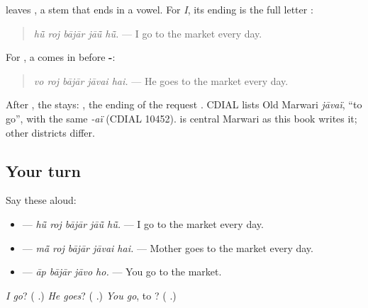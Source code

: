 \begin{grammarlens}[title={Grammar Lens: \mw{जा}}]
\textbf{} leaves \textbf{}, a stem that ends in a vowel. For \emph{I}, its ending is the full letter \textbf{}:

\begin{quote}
\textbf{    }
\end{quote}

\begin{quote}
\emph{hū̃ roj bājār jāū̃ hū̃.} — I go to the market every day.
\end{quote}

For \textbf{}, a \textbf{} comes in before \textbf{-}:

\begin{quote}
\textbf{    }
\end{quote}

\begin{quote}
\emph{vo roj bājār jāvai hai.} — He goes to the market every day.
\end{quote}

After \textbf{}, the \textbf{} stays: \textbf{  }, the ending of the request \textbf{}. CDIAL lists Old Marwari \emph{jāvaï}, \textquotedblleft{}to go\textquotedblright{}, with the same \emph{-aï} (CDIAL 10452). \textbf{} is central Marwari as this book writes it; other districts differ.
\end{grammarlens}

\subsection*{Your turn}
Say these aloud:

\begin{itemize}
\raggedright
  \item \textbf{    } — \emph{hū̃ roj bājār jāū̃ hū̃.} — I go to the market every day.
  \item \textbf{    } — \emph{mā̃ roj bājār jāvai hai.} — Mother goes to the market every day.
  \item \textbf{   } — \emph{āp bājār jāvo ho.} — You go to the market.
\end{itemize}

\begin{tcolorbox}[breakable,colback=teal!4,colframe=teal!35!black,title={Before you move on}]
\emph{I go}? (\textbf{ }.) \emph{He goes}? (\textbf{ }.) \emph{You go}, to \textbf{}? (\textbf{ }.)
\end{tcolorbox}
